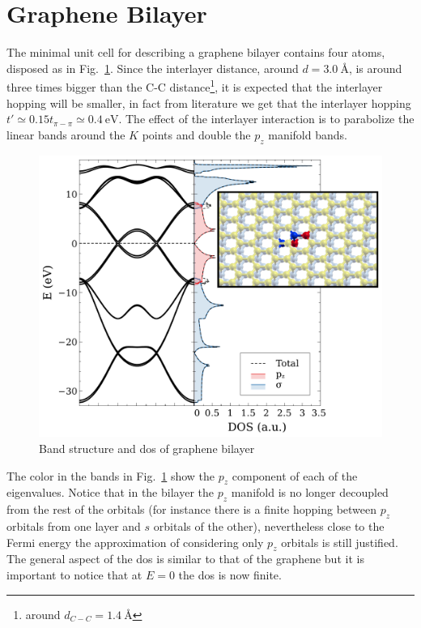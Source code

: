 \section{Graphene Bilayer}
The minimal unit cell for describing a graphene bilayer contains four atoms, disposed as in Fig.~\ref{bilayer}. Since the interlayer distance, around $d = \SI{3.0}{\angstrom}$, is  around three times bigger than the C-C distance\footnote{around $d_{C-C} = \SI{1.4}{\angstrom}$}, it is expected that the interlayer hopping will be smaller, in fact from literature\cite{KatsnelsonBook} we get that the interlayer hopping $t'\simeq 0.15t_{\pi-\pi}\simeq\SI{0.4}{\eV}$. The effect of the interlayer interaction is to parabolize the linear bands around the $K$ points and double the $p_z$ manifold bands.
\begin{figure}[h!]
\centering
\includegraphics{chapter06/figures/bilayer_bandDOS.pdf}
\vspace{-5pt}
\caption{Band structure and \ac{dos} of graphene bilayer}
\label{bilayer}
\end{figure}
\FloatBarrier
The color in the bands in Fig.~\ref{bilayer} show the $p_z$ component of each of the eigenvalues. Notice that in the bilayer the $p_z$ manifold is no longer decoupled from the rest of the orbitals (for instance there is a finite hopping between $p_z$ orbitals from one layer and $s$ orbitals of the other), nevertheless close to the Fermi energy the approximation of considering only $p_z$ orbitals is still justified.
The general aspect of the \ac{dos} is similar to that of the graphene but it is important to notice that at $E=0$ the \ac{dos} is now finite.

